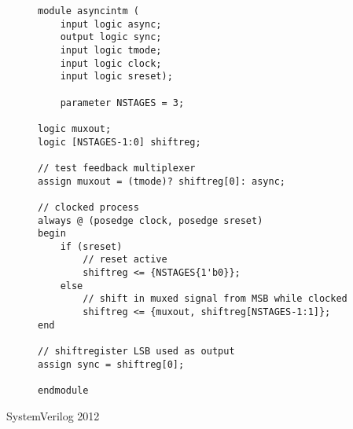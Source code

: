 \begin{center}
    \begin{figure}[h]
        \begin{verbatim}
module asyncintm (
    input logic async;
    output logic sync;
    input logic tmode;
    input logic clock;
    input logic sreset);

    parameter NSTAGES = 3;

logic muxout;
logic [NSTAGES-1:0] shiftreg;

// test feedback multiplexer
assign muxout = (tmode)? shiftreg[0]: async;

// clocked process
always @ (posedge clock, posedge sreset)
begin
    if (sreset)
        // reset active
        shiftreg <= {NSTAGES{1'b0}};
    else
        // shift in muxed signal from MSB while clocked
        shiftreg <= {muxout, shiftreg[NSTAGES-1:1]};
end

// shiftregister LSB used as output
assign sync = shiftreg[0];

endmodule
        \end{verbatim}
    \end{figure}
    SystemVerilog 2012
\end{center}
